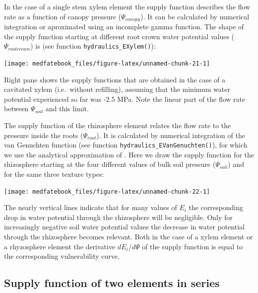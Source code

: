 \documentclass[]{book}
\begin{document}
In the case of a single stem xylem element the supply function describes
the flow rate as a function of canopy pressure (\(\Psi_{canopy}\)). It
can be calculated by numerical integration or aproximated using an
incomplete gamma function. The shape of the supply function starting at
different root crown water potential values (\(\Psi_{rootcrown}\)) is
(see function \texttt{hydraulics\_EXylem()}):

\begin{center}\texttt{[image: medfatebook\_files/figure-latex/unnamed-chunk-21-1]} \end{center}

Right pane shows the supply functions that are obtained in the case of a
cavitated xylem (i.e.~without refilling), assuming that the minimum
water potential experienced so far was -2.5 MPa. Note the linear part of
the flow rate between \(\Psi_{soil}\) and this limit.

The supply function of the rhizosphere element relates the flow rate to
the pressure inside the roots (\(\Psi_{root}\)). It is calculated by
numerical integration of the van Genuchten function (see function
\texttt{hydraulics\_EVanGenuchten()}), for which we use the analytical
approximation of \citet{VanLier2009}. Here we draw the supply function
for the rhizosphere starting at the four different values of bulk soil
pressure (\(\Psi_{soil}\)) and for the same three texture types:

\begin{center}\texttt{[image: medfatebook\_files/figure-latex/unnamed-chunk-22-1]} \end{center}

The nearly vertical lines indicate that for many values of \(E_i\) the
corresponding drop in water potential through the rhizosphere will be
negligible. Only for increasingly negative soil water potential values
the decrease in water potential through the rhizosphere becomes
relevant. Both in the case of a xylem element or a rhyzosphere element
the derivative \(dE_i/d\Psi\) of the supply function is equal to the
corresponding vulnerability curve.

\subsection{Supply function of two elements in
series}\label{supply-function-of-two-elements-in-series}
\end{document}
